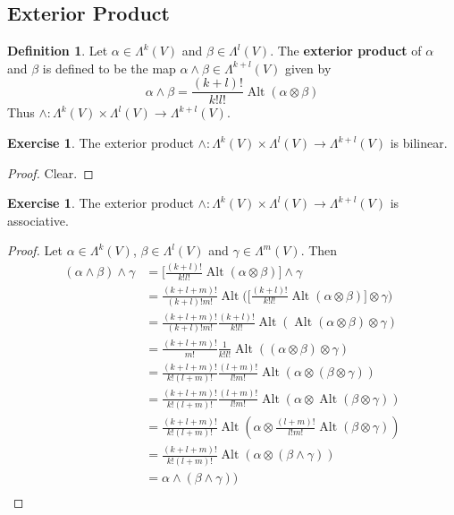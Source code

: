 \documentclass{book}
\theoremstyle{definition}
\newtheorem{defn}[definition]{Definition}
\newtheorem{ex}[definition]{Exercise}
\newcommand{\al}{\alpha}
\newcommand{\be}{\beta}
\newcommand{\gam}{\gamma}
\newcommand{\Lam}{\Lambda}
\DeclareMathOperator{\Alt}{Alt}
\DeclareMathOperator*{\0}{\mbf{0}}
\DeclareMathOperator*{\1}{\mbf{1}}
\newcommand{\tbf}[1]{\textbf{#1}}
\begin{document}
	
	
	
	
	
	
	
	
	
	
	
	
	
	
	
	
	
	
	
	
	\subsection{Exterior Product}
	
	\begin{defn}
		Let $\al \in \Lam^k(V)$ and $\be \in \Lam^l(V)$. The \tbf{exterior product} of $\al$ and $\be$ is defined to be the map $\al \wedge \be \in \Lam^{k+l}(V)$ given by $$\al \wedge \be = \frac{(k+l)!}{k! l!} \Alt(\al \otimes \be)$$ 
		Thus $\wedge: \Lam^k(V) \times \Lam^l(V) \rightarrow \Lam^{k+l}(V)$.
	\end{defn}

	\begin{ex}
		The exterior product $\wedge: \Lam^k(V) \times \Lam^l(V) \rightarrow \Lam^{k+l}(V)$ is bilinear.
	\end{ex}
	
	\begin{proof}
		Clear.
	\end{proof}

	\begin{ex}
		The exterior product $\wedge: \Lam^k(V) \times \Lam^l(V) \rightarrow \Lam^{k+l}(V)$ is associative. 
	\end{ex}

	\begin{proof}
		Let $\al \in \Lam^k(V)$, $\be \in \Lam^l(V)$ and $\gam \in \Lam^m(V)$. Then 
		\begin{align*}
			(\al \wedge \be) \wedge \gam
			&= \bigg [ \frac{(k+l)!}{k! l!} \Alt(\al \otimes \be) \bigg] \wedge \gam \\ 
			&= \frac{(k+l+m)!}{(k+l)!m!} \Alt \bigg( \bigg [ \frac{(k+l)!}{k! l!} \Alt(\al \otimes \be) \bigg] \otimes \gam \bigg)  \\ 
			&= \frac{(k+l+m)!}{(k+l)!m!}  \frac{(k+l)!}{k!l!}\Alt(\Alt(\al \otimes \be) \otimes \gam) \\
			&= \frac{(k+l+m)!}{m!}  \frac{1}{k!l!} \Alt((\al \otimes \be) \otimes \gam) \\
			&= \frac{(k+l+m)!}{k!(l+m)!}  \frac{(l+m)!}{l!m!} \Alt(\al \otimes (\be \otimes \gam)) \\
			&= \frac{(k+l+m)!}{k!(l+m)!}  \frac{(l+m)!}{l!m!} \Alt(\al \otimes \Alt(\be \otimes \gam)) \\
			&= \frac{(k+l+m)!}{k!(l+m)!} \Alt(\al \otimes \frac{(l+m)!}{l!m!} \Alt(\be \otimes \gam)) \\
			&= \frac{(k+l+m)!}{k!(l+m)!} \Alt(\al \otimes (\be \wedge \gam)) \\
			&= \al \wedge (\be \wedge \gam)) \\
		\end{align*}
	\end{proof}
	
\end{document}
